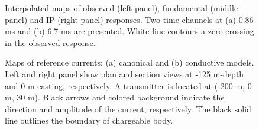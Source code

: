 \documentclass[extra,mreferee]{gji}
\begin{document}
\begin{figure}
  \caption{Interpolated maps of observed (left panel), fundamental (middle panel) and IP (right panel) responses. Two time channels at (a) 0.86 ms and (b) 6.7 ms are presented. White line contours a zero-crossing in the observed response.  
  }
  \label{F:IPresp_Plan}
\end{figure}

\begin{figure}
  \caption{Maps of reference currents: (a) canonical and (b) conductive models. Left and right panel show plan and section views at -125 m-depth and 0 m-easting, respectively. A transmitter is located at (-200 m, 0 m, 30 m). Black arrows and colored background indicate the direction and amplitude of the current, respectively. The black solid line outlines the boundary of chargeable body.}
  \label{F:ReferenceCurrent}
\end{figure}
\end{document}
